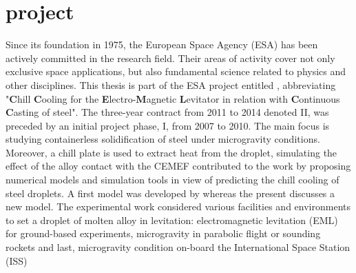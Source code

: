 \section*{\ccemlcc project}

Since its foundation in 1975, the European Space Agency (ESA) has been actively committed in the research field.
Their areas of activity cover not only exclusive space applications, but also fundamental science related to 
physics and other disciplines. This thesis is part of the ESA project entitled \ccemlcc, abbreviating
"\textbf{C}hill \textbf{C}ooling for the \textbf{E}lectro-\textbf{M}agnetic \textbf{L}evitator in relation with 
\textbf{C}ontinuous \textbf{C}asting of steel".
The three-year contract from 2011 to 2014 denoted \ccemlcc II, was preceded by an initial project phase, \ccemlcc I,
from 2007 to 2010. The main focus is studying containerless solidification of steel under microgravity conditions. 
Moreover, a chill plate is used to extract heat from the droplet, simulating the effect of the alloy contact with the 
CEMEF contributed to the work by proposing numerical models and simulation tools in 
view of predicting the chill cooling of steel droplets. A first model was developed by \citet{rivaux_simulation_2011} whereas
the present discusses a new model. The experimental work considered various facilities and environments 
to set a droplet of molten alloy in levitation: electromagnetic levitation (EML) for ground-based experiments, microgravity 
in parabolic flight or sounding rockets and last, microgravity condition on-board the International Space Station (ISS)

